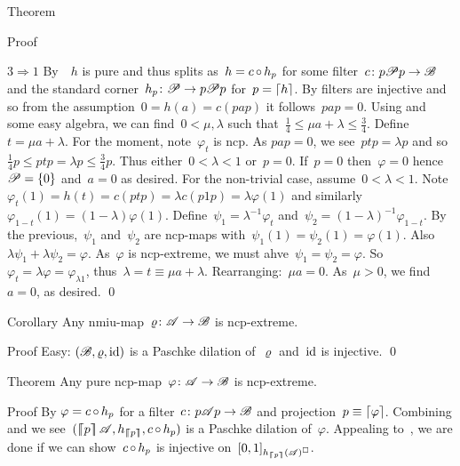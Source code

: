 \documentclass[b]{subfiles}
\begin{document}
\begin{parsec}
\begin{point}{Theorem}
\begin{point}{Proof}
\begin{point}{$3 \Rightarrow 1$}
By~~$h$ is pure
    and thus splits as~$h = c \mathop{\circ} h_p$
    for some filter~$c \colon p\mathscr{P} p \to \mathscr{B}$
    and the standard corner~$h_p\colon \mathscr{P} \to p\mathscr{P} p$
    for~$p = \left\lceil h\right\rceil$.
By  filters are injective
    and so from the assumption~$0 = h(a) = c(pap)$
    it follows~$pap = 0$.
Using  and some easy algebra,
    we can find~$0 < \mu,\lambda$
    such that~$\frac{1}{4} \leq \mu a + \lambda \leq \frac{3}{4}$.
Define~$t = \mu a + \lambda$.
For the moment, note~$\varphi_t$ is ncp.
As $pap = 0$, we see~$ptp = \lambda p$ and
so~$\frac{1}{4} p \leq  ptp = \lambda p
    \leq \frac{3}{4} p$.
Thus either~$0 < \lambda < 1$ or~$p = 0$.
If~$p = 0$ then~$\varphi=0$ hence~$\mathscr{P} = \{0\}$
    and~$a = 0$ as desired.
For the non-trivial case, assume~$0 < \lambda <1$.
Note~$\varphi_t(1) = h(t) = c(ptp) = \lambda c(p1p) = \lambda \varphi(1)$
    and similarly~$\varphi_{1-t}(1) = (1-\lambda) \varphi(1)$.
Define~$\psi_1 = \lambda^{-1} \varphi_t$
and~$\psi_2 = (1-\lambda)^{-1}\varphi_{1-t}$.
By the previous,~$\psi_1$ and~$\psi_2$ are ncp-maps
    with~$\psi_1(1)=\psi_2(1)=\varphi(1)$.
Also~$\lambda \psi_1 + \lambda \psi_2 = \varphi$.
As~$\varphi$ is ncp-extreme,
    we must ahve~$\psi_1 = \psi_2 = \varphi$.
So~$\varphi_t = \lambda \varphi = \varphi_{\lambda 1}$,
    thus~$\lambda = t \equiv \mu a + \lambda$.
    Rearranging:~$\mu a = 0$.
    As~$\mu > 0$, we find~$a=0$, as desired. \qed
\end{point}
\end{point}
\end{point}
\begin{point}{Corollary}%
Any nmiu-map~$\varrho\colon \mathscr{A} \to \mathscr{B}$ is ncp-extreme. 
\begin{point}{Proof}%
Easy: $(\mathscr{B}, \varrho, \operatorname{id})$ is a Paschke dilation of~$\varrho$
and~$\operatorname{id}$ is injective.  \qed
\end{point}
\end{point}
\begin{point}{Theorem}%
Any pure ncp-map~$\varphi\colon \mathscr{A} \to \mathscr{B}$ is ncp-extreme.
\begin{point}{Proof}%
By  $\varphi = c \mathop{\circ} h_p$
    for a filter~$c\colon p\mathscr{A} p \to \mathscr{B}$
    and projection~$p \equiv \left\lceil\varphi\right\rceil$.
Combining  and 
    we see~$(\cceil{p}\scrA, h_{\cceil{p}}, c\after h_p)$
    is a Paschke dilation of~$\varphi$.
Appealing to~,
    we are done if we can show~$c \mathop{\circ} h_p$
    is injective on~$[0,1]_{h_{\left\lceil\!\!\left\lceil p\right\rceil\!\!\right\rceil}(\mathscr{A})^\square}$.

\end{point}
\end{point}
\end{parsec}
\end{document}

